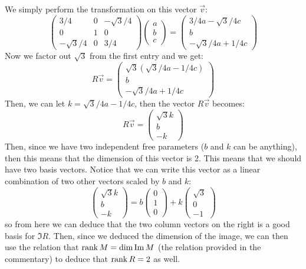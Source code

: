 \documentclass{article}
\begin{document}
\begin{solution}
	We simply perform the transformation on this vector $\vec v$: 
	\[
		\begin{pmatrix} 3 / 4 & 0 & -\sqrt{3} /4\\0 & 1& 0\\-\sqrt{3} /4 &0 & 3 / 4 \end{pmatrix} \begin{pmatrix} a\\b\\c \end{pmatrix} = \begin{pmatrix} 3 / 4a - \sqrt{3} /4c\\b\\-\sqrt{3} /4a + 1 / 4c \end{pmatrix} 
	\] 
	Now we factor out $\sqrt{3}$ from the first entry and we get: 
	\[
	R \vec v = \begin{pmatrix} \sqrt{3} \left( \sqrt{3} /4a - 1 / 4c\right)\\b \\-\sqrt{3} /4 a + 1 / 4 c
	\end{pmatrix} 
	\] 
	Then, we can let $k = \sqrt{3} /4a - 1/4 c$, then the vector $R \vec v$ becomes: 
	\[
	R \vec v = \begin{pmatrix} \sqrt{3} k\\b\\-k \end{pmatrix} 
	\] 
	Then, since we have two independent free parameters ($b$ and $k$ can be anything), then this means that
	the dimension of this vector is 2. This means that we should have two basis vectors. Notice that we can 
	write this vector as a linear combination of two other vectors scaled by $b$ and $k$:
	\[
	\begin{pmatrix} \sqrt{3} k\\b\\-k \end{pmatrix}  = b \begin{pmatrix} 0\\1\\0 \end{pmatrix} + k
	\begin{pmatrix} \sqrt{3} \\0\\-1 \end{pmatrix} 
	\] 
	so from here we can deduce that the two column vectors on the right is a good basis for $\Im R$. Then, 
	since we deduced the dimension of the image, we can then use the relation that $\rank M = \dim \operatorname{Im} M$ 
	(the relation provided in the commentary) to deduce that $\rank R = 2$ as well.
\end{solution}
\end{document}
